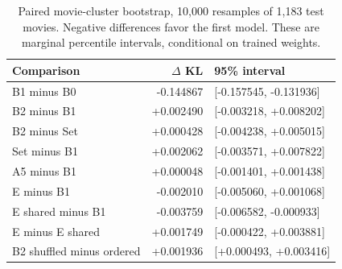 \begin{table}[!htbp]
\centering
\small
\setlength{\tabcolsep}{5pt}
\begin{tabular}{lrl}
\toprule
Comparison & $\Delta$ KL & 95\% interval \\
\midrule
B1 minus B0 & -0.144867 & [-0.157545, -0.131936] \\
B2 minus B1 & +0.002490 & [-0.003218, +0.008202] \\
B2 minus Set & +0.000428 & [-0.004238, +0.005015] \\
Set minus B1 & +0.002062 & [-0.003571, +0.007822] \\
A5 minus B1 & +0.000048 & [-0.001401, +0.001438] \\
E minus B1 & -0.002010 & [-0.005060, +0.001068] \\
E shared minus B1 & -0.003759 & [-0.006582, -0.000933] \\
E minus E shared & +0.001749 & [-0.000422, +0.003881] \\
B2 shuffled minus ordered & +0.001936 & [+0.000493, +0.003416] \\
\bottomrule
\end{tabular}
\caption{Paired movie-cluster bootstrap, 10,000 resamples of 1,183 test movies. Negative differences favor the first model. These are marginal percentile intervals, conditional on trained weights.}
\label{tab:bootstrap}
\end{table}
